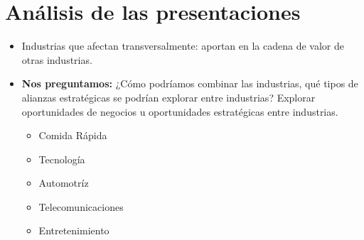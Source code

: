 \section{Análisis de las presentaciones}
\begin{itemize}
    \item Industrias que afectan transversalmente: aportan en la cadena de valor de otras industrias.
    \item \textbf{Nos preguntamos:} ¿Cómo podríamos combinar las industrias, qué tipos de alianzas estratégicas se podrían explorar entre industrias? Explorar oportunidades de negocios u oportunidades estratégicas entre industrias.
        \begin{itemize}
            \item Comida Rápida 
            \item Tecnología 
            \item Automotríz 
            \item Telecomunicaciones
            \item Entretenimiento 
        \end{itemize}    
\end{itemize}
